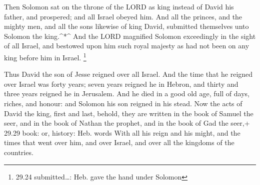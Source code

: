  Then Solomon sat on the throne of the LORD as king instead
of David his father, and prospered; and all Israel obeyed him.
 And all the princes, and the mighty men, and all the sons
likewise of king David, submitted themselves unto Solomon the
king.\^{}*\^{}  And the LORD magnified Solomon exceedingly
in the sight of all Israel, and bestowed upon him such royal majesty as
had not been on any king before him in Israel. \footnote{29.24
  submitted\ldots: Heb. gave the hand under Solomon}

 Thus David the son of Jesse reigned over all Israel.
 And the time that he reigned over Israel was forty years;
seven years reigned he in Hebron, and thirty and three years reigned he
in Jerusalem.  And he died in a good old age, full of days,
riches, and honour: and Solomon his son reigned in his stead.
 Now the acts of David the king, first and last, behold,
they are written in the book of Samuel the seer, and in the book of
Nathan the prophet, and in the book of Gad the seer,+ 29.29 book: or,
history: Heb. words  With all his reign and his might, and
the times that went over him, and over Israel, and over all the kingdoms
of the countries.
